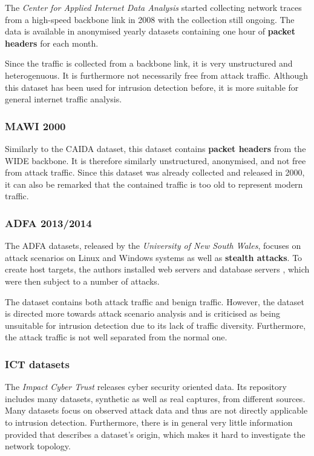 \documentclass[a4paper,12pt,twoside]{report}
\begin{document}
The \textit{Center for Applied Internet Data Analysis} started collecting network traces from a high-speed backbone link in 2008 with the collection still ongoing. The data is available in anonymised yearly datasets containing one hour of \textbf{packet headers} for each month. 

Since the traffic is collected from a backbone link, it is very unstructured and heterogenuous. It is furthermore not necessarily free from attack traffic. Although this dataset has been used for intrusion detection before, it is more suitable for general internet traffic analysis.


\subsubsection*{MAWI 2000 \cite{sony2000traffic}}



Similarly to the CAIDA dataset, this dataset contains \textbf{packet headers} from the WIDE backbone. It is therefore similarly unstructured, anonymised, and not free from attack traffic. Since this dataset was already collected and released in 2000, it can also be remarked that the contained traffic is too old to represent modern traffic. 

\subsubsection*{ADFA 2013/2014 \cite{creech2014developing,creech2013generation}}

The ADFA datasets, released by the \textit{University of New South Wales}, focuses on attack scenarios on Linux and Windows systems as well as \textbf{stealth attacks}. To create host targets, the authors  installed web servers and database servers , which were then subject to a number of attacks. 

The dataset contains both attack traffic and benign traffic. However, the dataset is directed more towards attack scenario analysis and is criticised as being unsuitable for intrusion detection due to its lack of traffic diversity. Furthermore, the attack traffic is not well separated from the normal one.

\subsubsection*{ICT datasets \cite{USC2010ICT}}

The \textit{Impact Cyber Trust} releases cyber security oriented data. Its repository includes many datasets, synthetic as well as real captures, from different sources. Many datasets focus on observed attack data and thus are not directly applicable to intrusion detection. Furthermore, there is in general very little information provided that describes a dataset's origin, which makes it hard to investigate the network topology.
\end{document}
